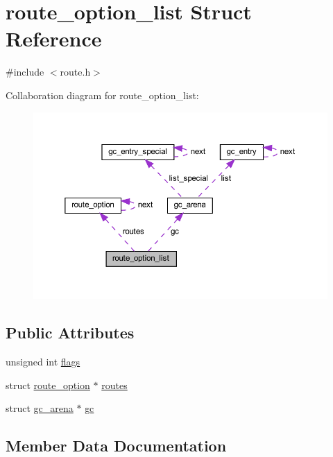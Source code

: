 \hypertarget{structroute__option__list}{}\section{route\+\_\+option\+\_\+list Struct Reference}
\label{structroute__option__list}


{\ttfamily \#include $<$route.\+h$>$}



Collaboration diagram for route\+\_\+option\+\_\+list\+:
\nopagebreak
\begin{figure}[H]
\begin{center}
\leavevmode
\includegraphics[width=350pt]{structroute__option__list__coll__graph}
\end{center}
\end{figure}
\subsection*{Public Attributes}
\begin{DoxyCompactItemize}
\item 
unsigned int \hyperlink{structroute__option__list_ad9af4582edb27d213868f153bfe0af7f}{flags}
\item 
struct \hyperlink{structroute__option}{route\+\_\+option} $\ast$ \hyperlink{structroute__option__list_adf288d5d22a4271d7b2c3a409962fbb2}{routes}
\item 
struct \hyperlink{structgc__arena}{gc\+\_\+arena} $\ast$ \hyperlink{structroute__option__list_ac768396edd7ff53282f123d4e8508c0d}{gc}
\end{DoxyCompactItemize}


\subsection{Member Data Documentation}
\hypertarget{structroute__option__list_ad9af4582edb27d213868f153bfe0af7f}{}
